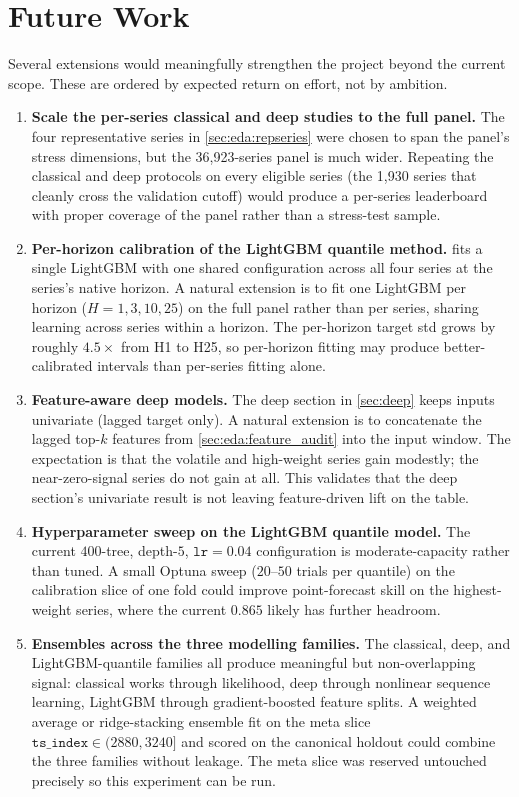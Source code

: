 \section{Future Work}
\label{sec:future_work}

Several extensions would meaningfully strengthen the project beyond the current scope. These are ordered by expected return on effort, not by ambition.

\begin{enumerate}
  \item \textbf{Scale the per-series classical and deep studies to the full panel.} The four representative series in \cref{sec:eda:repseries} were chosen to span the panel's stress dimensions, but the 36{,}923-series panel is much wider. Repeating the classical and deep protocols on every eligible series (the 1{,}930 series that cleanly cross the validation cutoff) would produce a per-series leaderboard with proper coverage of the panel rather than a stress-test sample.
  \item \textbf{Per-horizon calibration of the LightGBM quantile method.}  fits a single LightGBM with one shared configuration across all four series at the series's native horizon. A natural extension is to fit one LightGBM per horizon ($H = 1, 3, 10, 25$) on the full panel rather than per series, sharing learning across series within a horizon. The per-horizon target std grows by roughly $4.5\times$ from H1 to H25, so per-horizon fitting may produce better-calibrated intervals than per-series fitting alone.
  \item \textbf{Feature-aware deep models.} The deep section in \cref{sec:deep} keeps inputs univariate (lagged target only). A natural extension is to concatenate the lagged top-$k$ features from \cref{sec:eda:feature_audit} into the input window. The expectation is that the volatile and high-weight series gain modestly; the near-zero-signal series do not gain at all. This validates that the deep section's univariate result is not leaving feature-driven lift on the table.
  \item \textbf{Hyperparameter sweep on the LightGBM quantile model.} The current $400$-tree, depth-$5$, $\mathtt{lr}{=}0.04$ configuration is moderate-capacity rather than tuned. A small Optuna sweep ($20$--$50$ trials per quantile) on the calibration slice of one fold could improve point-forecast skill on the highest-weight series, where the current $0.865$ likely has further headroom.
  \item \textbf{Ensembles across the three modelling families.} The classical, deep, and LightGBM-quantile families all produce meaningful but non-overlapping signal: classical works through likelihood, deep through nonlinear sequence learning, LightGBM through gradient-boosted feature splits. A weighted average or ridge-stacking ensemble fit on the meta slice $\mathtt{ts\_index} \in (2880, 3240]$ and scored on the canonical holdout could combine the three families without leakage. The meta slice was reserved untouched precisely so this experiment can be run.

\end{enumerate}
